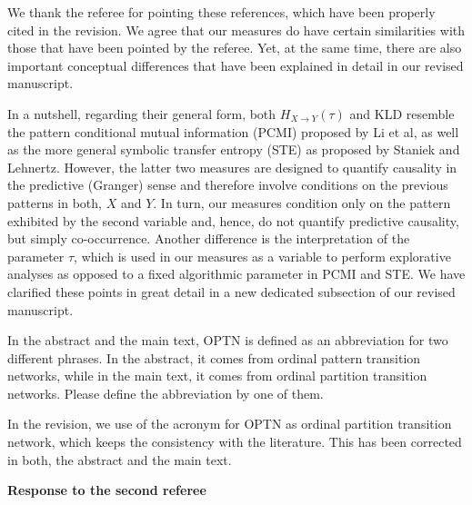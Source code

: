 \documentclass[aps,chaos,superscriptaddress,showkeys]{revtex4}
\begin{document}
\begin{center}
\begin{minipage}[c]{0.9\textwidth}
We thank the referee for pointing these references, which have been properly cited in the revision. We agree that our measures do have certain similarities with those that have been pointed by the referee. Yet, at the same time, there are also important conceptual differences that have been explained in detail in our revised manuscript. 

\vspace{0.5cm}
In a nutshell, regarding their general form, both $H_{X \to Y}(\tau)$ and KLD resemble the pattern conditional mutual information (PCMI) proposed by Li et al, as well as the more general symbolic transfer entropy (STE) as proposed by Staniek and Lehnertz. However, the latter two measures are designed to quantify causality in the predictive (Granger) sense and therefore involve conditions on the previous patterns in both, $X$ and $Y$. In turn, our measures condition only on the pattern exhibited by the second variable and, hence, do not quantify predictive causality, but simply co-occurrence. Another difference is the interpretation of the parameter $\tau$, which is used in our measures as a variable to perform explorative analyses as opposed to a fixed algorithmic parameter in PCMI and STE. We have clarified these points in great detail in a new dedicated subsection of our revised manuscript. 
\end{minipage}
\end{center}

\noindent
{\sf In the abstract and the main text, OPTN is defined as an abbreviation for two different phrases. In the abstract, it comes from ordinal pattern transition networks, while in the main text, it comes from ordinal partition transition networks. Please define the abbreviation by one of them. }

\begin{center}
\begin{minipage}[c]{0.9\textwidth}
In the revision, we use of the acronym for OPTN as ordinal partition transition network, which keeps the consistency with the literature. This has been corrected in both, the abstract and the main text. 
\end{minipage}
\end{center}

\vspace{0.4cm}
\begin{center}
{\bf Response to the second referee}
\end{center}
\end{document}
